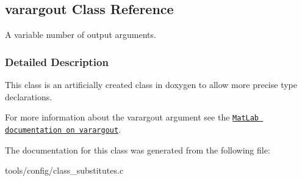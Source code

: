 \hypertarget{classvarargout}{}\subsection{varargout Class Reference}
\label{classvarargout}


A variable number of output arguments.  




\subsubsection{Detailed Description}
This class is an artificially created class in doxygen to allow more precise type declarations.

For more information about the varargout argument see the \href{http://www.mathworks.de/help/techdoc/ref/varargout.html}{\tt Mat\+Lab documentation on varargout}. 

The documentation for this class was generated from the following file\+:\begin{DoxyCompactItemize}
\item 
tools/config/class\+\_\+substitutes.\+c\end{DoxyCompactItemize}
